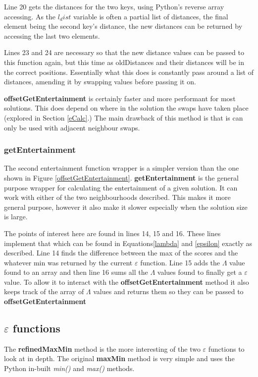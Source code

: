 \documentclass[12pt]{report}
\begin{document}
Line 20 gets the distances for the two keys, using Python's reverse array accessing. As the $l_dist$ variable is often a partial list of distances, the final element being the second key's distance, the new distances can be returned by accessing the last two elements.

Lines 23 and 24 are necessary so that the new distance values can be passed to this function again, but this time as oldDistances and their distances will be in the correct positions. Essentially what this does is constantly pass around a list of distances, amending it by swapping values before passing it on.

\textbf{offsetGetEntertainment} is certainly faster and more performant for most solutions. This does depend on where in the solution the swaps have taken place (explored in Section \ref{eCalc}.) The main drawback of this method is that is can only be used with adjacent neighbour swaps.

\subsubsection{getEntertainment}
The second entertainment function wrapper is a simpler version than the one shown in Figure \ref{offsetGetEntertainment}. \textbf{getEntertainment} is the general purpose wrapper for calculating the entertainment of a given solution. It can work with either of the two neighbourhoods described. This makes it more general purpose, however it also make it slower especially when the solution size is large.

The points of interest here are found in lines 14, 15 and 16. These lines implement that which can be found in Equations\ref{lambda} and \ref{epsilon} exactly as described. Line 14 finds the difference between the max of the scores and the whatever min was returned by the current $\varepsilon$ function. Line 15 adds the $\Lambda$ value found to an array and then line 16 sums all the $\Lambda$ values found to finally get a $\varepsilon$ value. To allow it to interact with the \textbf{offsetGetEntertainment} method it also keeps track of the array of $\Lambda$ values and returns them so they can be passed to \textbf{offsetGetEntertainment} 


\subsection{$\varepsilon$ functions}\label{Imp-eFunctions}
The \textbf{refinedMaxMin} method is the more interesting of the two $\varepsilon$ functions to look at in depth. The original \textbf{maxMin} method is very simple and uses the Python in-built \textit{min()} \cite{PythonMin} and \textit{max()} \cite{PythonMax} methods.
\end{document}
